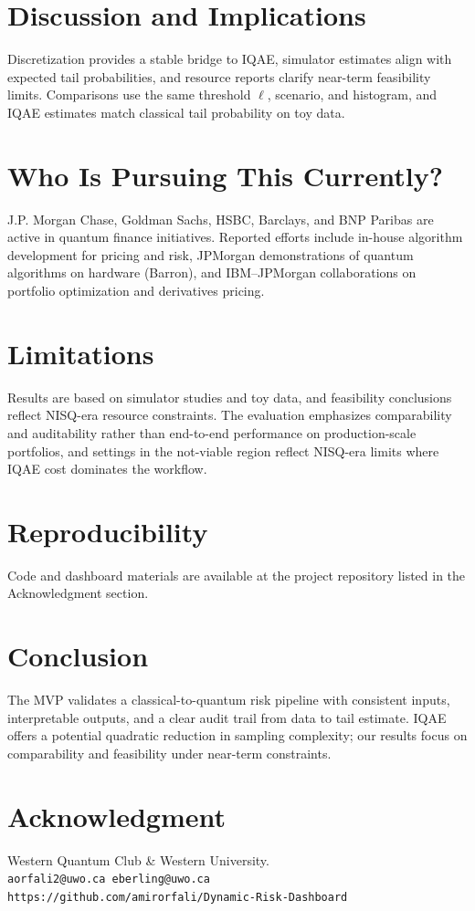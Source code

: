 \documentclass[conference]{IEEEtran}
\begin{document}
\section{Discussion and Implications}
Discretization provides a stable bridge to IQAE, simulator estimates align with expected tail probabilities, and resource reports clarify near-term feasibility limits. Comparisons use the same threshold $\ell$, scenario, and histogram, and IQAE estimates match classical tail probability on toy data.

\section{Who Is Pursuing This Currently?}
J.P. Morgan Chase, Goldman Sachs, HSBC, Barclays, and BNP Paribas are active in quantum finance initiatives. Reported efforts include in-house algorithm development for pricing and risk, JPMorgan demonstrations of quantum algorithms on hardware (Barron), and IBM--JPMorgan collaborations on portfolio optimization and derivatives pricing.

\section{Limitations}
Results are based on simulator studies and toy data, and feasibility conclusions reflect NISQ-era resource constraints. The evaluation emphasizes comparability and auditability rather than end-to-end performance on production-scale portfolios, and settings in the not-viable region reflect NISQ-era limits where IQAE cost dominates the workflow.

\section{Reproducibility}
Code and dashboard materials are available at the project repository listed in the Acknowledgment section.

\section{Conclusion}
The MVP validates a classical-to-quantum risk pipeline with consistent inputs, interpretable outputs, and a clear audit trail from data to tail estimate. IQAE offers a potential quadratic reduction in sampling complexity; our results focus on comparability and feasibility under near-term constraints.

\section*{Acknowledgment}
Western Quantum Club \& Western University.\\
\texttt{aorfali2@uwo.ca \quad eberling@uwo.ca}\\
\texttt{https://github.com/amirorfali/Dynamic-Risk-Dashboard}
\end{document}
